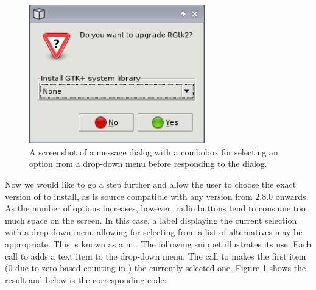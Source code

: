 \documentclass[article,shortnames]{jss}
\begin{document}
\begin{figure}[tbp]
  \begin{center}
    \includegraphics[width=3in]{combo-dialog.png}
    \caption{\label{fig:combo-dialog}A screenshot of a message dialog
with
      a 
      combobox for selecting an option from a drop-down menu before
      responding to
      the dialog.}
  \end{center}
\end{figure}

Now we would like to go a step further and allow the user to choose
the exact version of  to install, as  is source
compatible with any version from $2.8.0$ onwards. As the number of
options increases, however, radio buttons tend to consume too much
space on the screen. In this case, a label displaying the current
selection with a drop down menu allowing for selecting from a list of
alternatives may be appropriate.  This is known as a
 in . The following snippet illustrates
its use. Each call to  adds a text item to
the drop-down menu. The call to  makes the
first item ($0$ due to zero-based counting in ) the
currently selected
one. Figure \ref{fig:combo-dialog} shows the result and below is the
corresponding code:
\end{document}
